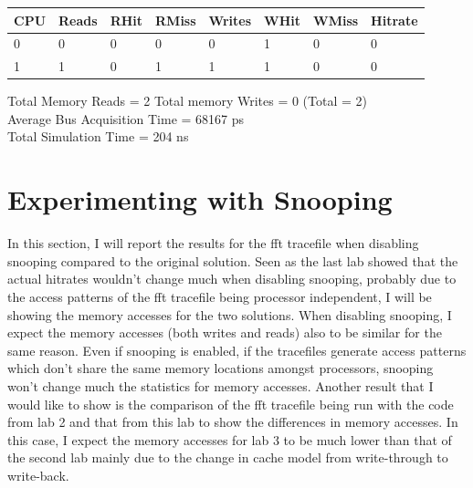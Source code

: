 \documentclass[]{article}
\begin{document}
\begin{table}[H]
	\begin{tabular}{|l|l|l|l|l|l|l|l|}
		\hline
		\textbf{CPU} & \textbf{Reads} & \textbf{RHit} & \textbf{RMiss} & \textbf{Writes} & \textbf{WHit} & \textbf{WMiss} & \textbf{Hitrate} \\ \hline
		0            & 0          & 0          & 0          & 0           & 1          & 0          & 0        \\ \hline
		1            & 1          & 0          & 1          & 1           & 1          & 0          & 0        \\ \hline
	\end{tabular}
\end{table}

Total Memory Reads = 2 Total memory Writes = 0 (Total = 2)\\
Average Bus Acquisition Time = 68167 ps\\
Total Simulation Time = 204 ns


\section{Experimenting with Snooping}

In this section, I will report the results for the fft tracefile when disabling snooping compared to the original solution. Seen as the last lab showed that the actual hitrates wouldn't change much when disabling snooping, probably due to the access patterns of the fft tracefile being processor independent, I will be showing the memory accesses for the two solutions. When disabling snooping, I expect the memory accesses (both writes and reads) also to be similar for the same reason. Even if snooping is enabled, if the tracefiles generate access patterns which don't share the same memory locations amongst processors, snooping won't change much the statistics for memory accesses. Another result that I would like to show is the comparison of the fft tracefile being run with the code from lab 2 and that from this lab to show the differences in memory accesses. In this case, I expect the memory accesses for lab 3 to be much lower than that of the second lab mainly due to the change in cache model from write-through to write-back.
\end{document}
